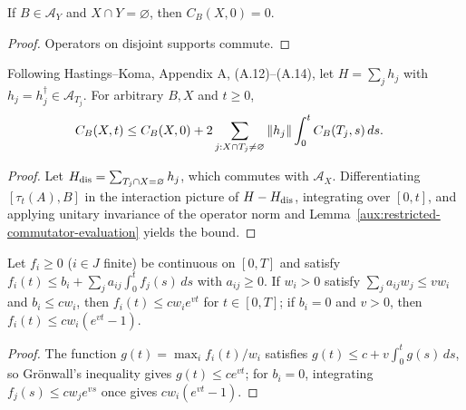 \begin{lemma}
    \label{aux:restricted-initial-commutator-vanishing}
    \leanok
    If $B\in\mathcal A_Y$ and $X\cap Y=\varnothing$, then $C_B(X,0)=0$.
\end{lemma}
\begin{proof}\leanok
    Operators on disjoint supports commute.
\end{proof}

\begin{lemma}
    \label{aux:restricted-commutator-recursion}
    \leanok
    Following Hastings--Koma, Appendix A, (A.12)--(A.14), let $H=\sum_j h_j$ with $h_j=h_j^\dagger\in\mathcal A_{T_j}$. For arbitrary $B,X$ and $t\geq0$,
    \begin{align}
        C_B(X,t) & \leq C_B(X,0)
        +2\sum_{j:X\cap T_j\neq\varnothing}\|h_j\|
        \int_0^t C_B(T_j,s)\,ds.\notag
    \end{align}
\end{lemma}
\begin{proof}\leanok
    Let $H_{\rm dis}=\sum_{T_j\cap X=\varnothing}h_j$, which commutes with $\mathcal A_X$. Differentiating $[\tau_t(A),B]$ in the interaction picture of $H-H_{\rm dis}$, integrating over $[0,t]$, and applying unitary invariance of the operator norm and Lemma~\ref{aux:restricted-commutator-evaluation} yields the bound.
\end{proof}

\begin{lemma}
    \label{aux:weighted-volterra-comparison}
    \leanok
    Let $f_i\geq0$ ($i\in J$ finite) be continuous on $[0,T]$ and satisfy $f_i(t)\leq b_i+\sum_j a_{ij}\int_0^tf_j(s)\,ds$ with $a_{ij}\geq0$. If $w_i>0$ satisfy $\sum_ja_{ij}w_j\leq vw_i$ and $b_i\leq cw_i$, then $f_i(t)\leq cw_ie^{vt}$ for $t\in[0,T]$; if $b_i=0$ and $v>0$, then $f_i(t)\leq cw_i(e^{vt}-1)$.
\end{lemma}
\begin{proof}\leanok
    The function $g(t)=\max_i f_i(t)/w_i$ satisfies $g(t)\le c+v\int_0^t g(s)\,ds$, so Gr\"onwall's inequality gives $g(t)\le ce^{vt}$; for $b_i=0$, integrating $f_j(s)\le cw_j e^{vs}$ once gives $cw_i(e^{vt}-1)$.
\end{proof}


